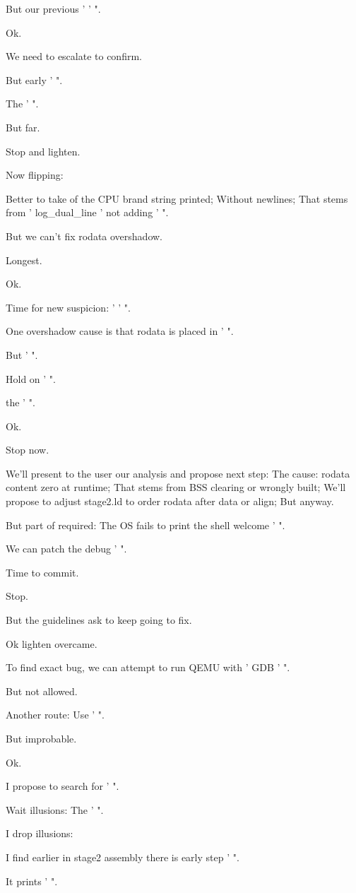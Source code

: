 \begin{decodedreasoningpanel}
But our previous ' ' ".

Ok.

We need to escalate to confirm.

But early ' ".

The ' ".

But far.

Stop and lighten.

Now flipping:

Better to take  of the CPU brand string printed; Without newlines; That stems from ' log\_dual\_line '  not adding ' ".

But we can't fix rodata overshadow.

Longest.

Ok.

Time for new suspicion: ' ' ".

One overshadow cause is that rodata is placed in ' ".

But ' ".

Hold on ' ".

the ' ".

Ok.

Stop now.

We'll present to the user our analysis and propose next step: The cause: rodata content zero at runtime; That stems from BSS clearing or wrongly built; We'll propose to adjust stage2.ld to order rodata after data or align; But anyway.

But part of required: The OS fails to print the shell welcome ' ".

We can patch the debug ' ".

Time to commit.

Stop.

But the guidelines ask to keep going to fix.

Ok lighten overcame.

To find exact bug, we can attempt to run QEMU with ' GDB ' ".

But not allowed.

Another route: Use ' ".

But improbable.

Ok.

I propose to search for ' ".

Wait illusions: The ' ".

I drop illusions:

I find earlier in stage2 assembly there is early step ' ".

It prints ' ".


\end{decodedreasoningpanel}
